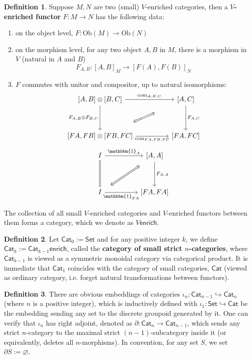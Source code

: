 \documentclass{article}
\theoremstyle{definition}
\newtheorem{mydef}{Definition}[section]
\theoremstyle{remark}
\begin{document}
\begin{mydef}
Suppose $M,N$ are two (small) $V$-enriched categories, then a \textbf{$V$-enriched functor} $F:M \to N$ has the following data:
\begin{enumerate}
    \item on the object level, $F: \mathrm{Ob}(M) \to \mathrm{Ob}(N)$
    \item on the morphism level, for any two object $A,B$ in $M$, there is a morphism in $V$ (natural in $A$ and $B$)$$ F_{A,B}:[A,B]_M \to [F(A),F(B)]_N $$
    \item $F$ commutes with unitor and compositor, up to natural isomorphisms: $$ \begin{tikzcd}[column sep=huge,row sep=huge] [A,B] \otimes [B,C] \arrow[d, "{F_{A,B} \otimes F_{B,C}}"'] \arrow[r, "{\mathrm{com}_{A,B,C}}"] & {[A,C]} \arrow[d, "F_{A,C}"] \\ {[FA,FB] \otimes [FB,FC]} \arrow[r, "{\mathrm{com}_{FA,FB,FC}}"'] \arrow[shorten <=30pt,shorten >=30pt,ru,Leftrightarrow]& {[FA,FC]} \end{tikzcd} $$    $$\begin{tikzcd}[column sep=huge,row sep=huge] I \arrow[r, "\mathbbm{1}_{A}"] \arrow[d,equal] & {[A,A]} \arrow[d, "{F_{A,A}}"] \\ I \arrow[r, "\mathbbm{1}_{FA}"'] \arrow[shorten <=10pt,shorten >=10pt,ru,Leftrightarrow] & {[FA,FA]} \end{tikzcd}$$
\end{enumerate}
The collection of all small $V$-enriched categories and $V$-enriched functors between them forms a category, which we denote as $V\mathsf{enrich}$.

\end{mydef}

\begin{mydef}
Let $\mathsf{Cat}_0:=\mathsf{Set}$ and for any positive integer $k$, we define $\mathsf{Cat}_k:=\mathsf{Cat}_{k-1}\mathsf{enrich}$, called the \textbf{category of small strict $n$-categories}, where $\mathsf{Cat}_{k-1}$ is viewed as a symmetric monoidal category via categorical product. It is immediate that $\mathsf{Cat}_{1}$ coincides with the category of small categories, $\mathsf{Cat}$ (viewed as ordinary category, i.e. forget natural transformations between functors).
\end{mydef}

\begin{mydef}

There are obvious embeddings of categories $ \iota_n: \mathsf{Cat}_{n-1} \hookrightarrow \mathsf{Cat}_n$ (where $n$ is a positive integer), which is inductively defined with $\iota_1: \mathsf{Set} \hookrightarrow \mathsf{Cat}$ be the embedding sending any set to the discrete groupoid generated by it. One can verify that $\iota_n$ has right adjoint, denoted as $\partial: \mathsf{Cat}_n \to \mathsf{Cat}_{n-1}$, which sends any strict $n$-category to the maximal strict $(n-1)$-subcategory inside it (or equivalently, deletes all $n$-morphisms). In convention, for any set $S$, we set $\partial S:= \varnothing$.

\end{mydef}
\end{document}
